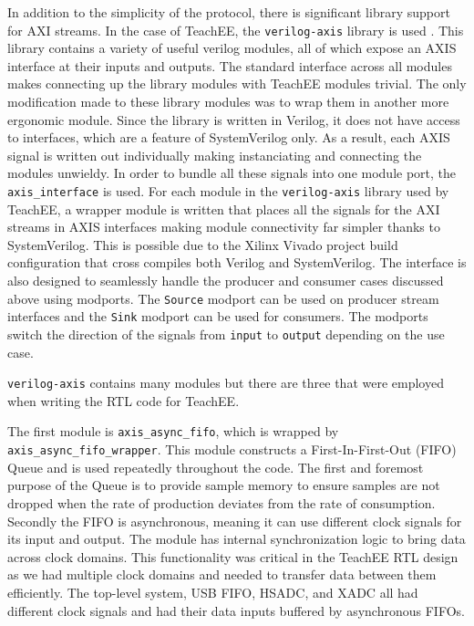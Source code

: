\documentclass[letterpaper,11pt]{article}
\newcommand{\code}[1]{\texttt{#1}}
\begin{document}
In addition to the simplicity of the protocol, there is significant library support for
AXI streams. In the case of TeachEE, the \code{verilog-axis} library is used
\cite{verilog_axis_lib}. This library contains a variety of useful verilog
modules, all of which expose an AXIS interface at their inputs and outputs. The
standard interface across all modules makes connecting up the library modules
with TeachEE modules trivial. The only modification made to these library
modules was to wrap them in another more ergonomic module. Since the library is
written in Verilog, it does not have access to interfaces, which are a feature
of SystemVerilog only. As a result, each AXIS signal is written out individually
making instanciating and connecting the modules unwieldy. In order to bundle all
these signals into one module port, the \code{axis_interface} is used. For each
module in the \code{verilog-axis} library used by TeachEE, a wrapper module is
written that places all the signals for the AXI streams in AXIS interfaces
making module connectivity far simpler thanks to SystemVerilog. This is possible
due to the Xilinx Vivado project build configuration that cross compiles both
Verilog and SystemVerilog. The interface is also designed to seamlessly handle
the producer and consumer cases discussed above using modports. The
\code{Source} modport can be used on producer stream interfaces and the
\code{Sink} modport can be used for consumers. The modports switch the direction
of the signals from \code{input} to \code{output} depending on the use case.

\code{verilog-axis} contains many modules but there are three that were employed
when writing the RTL code for TeachEE. 

The first module is \code{axis_async_fifo}, which is wrapped by
\code{axis_async_fifo_wrapper}. This module constructs a First-In-First-Out
(FIFO) Queue and is used repeatedly throughout the code. The first and foremost
purpose of the Queue is to provide sample memory to ensure samples are not
dropped when the rate of production deviates from the rate of consumption.
Secondly the FIFO is asynchronous, meaning it can use different clock signals
for its input and output. The module has internal synchronization logic to bring
data across clock domains. This functionality was critical in the TeachEE RTL
design as we had multiple clock domains and needed to transfer data between them
efficiently. The top-level system, USB FIFO, HSADC, and XADC all had different
clock signals and had their data inputs buffered by asynchronous FIFOs.
\end{document}
